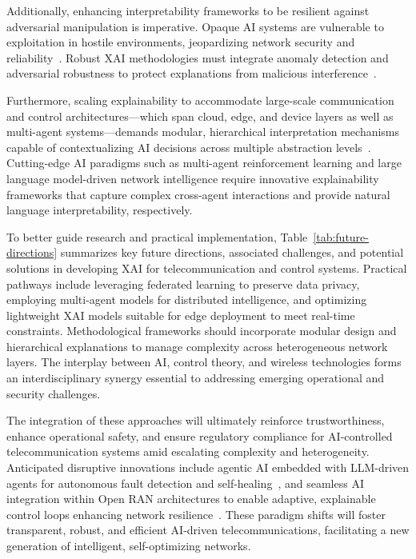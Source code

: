 \documentclass[sigconf]{acmart}
\begin{document}
Additionally, enhancing interpretability frameworks to be resilient against adversarial manipulation is imperative. Opaque AI systems are vulnerable to exploitation in hostile environments, jeopardizing network security and reliability~\cite{ref50}. Robust XAI methodologies must integrate anomaly detection and adversarial robustness to protect explanations from malicious interference~\cite{ref54}.

Furthermore, scaling explainability to accommodate large-scale communication and control architectures—which span cloud, edge, and device layers as well as multi-agent systems—demands modular, hierarchical interpretation mechanisms capable of contextualizing AI decisions across multiple abstraction levels~\cite{ref55}. Cutting-edge AI paradigms such as multi-agent reinforcement learning and large language model-driven network intelligence require innovative explainability frameworks that capture complex cross-agent interactions and provide natural language interpretability, respectively.

To better guide research and practical implementation, Table~\ref{tab:future-directions} summarizes key future directions, associated challenges, and potential solutions in developing XAI for telecommunication and control systems. Practical pathways include leveraging federated learning to preserve data privacy, employing multi-agent models for distributed intelligence, and optimizing lightweight XAI models suitable for edge deployment to meet real-time constraints. Methodological frameworks should incorporate modular design and hierarchical explanations to manage complexity across heterogeneous network layers. The interplay between AI, control theory, and wireless technologies forms an interdisciplinary synergy essential to addressing emerging operational and security challenges.

The integration of these approaches will ultimately reinforce trustworthiness, enhance operational safety, and ensure regulatory compliance for AI-controlled telecommunication systems amid escalating complexity and heterogeneity. Anticipated disruptive innovations include agentic AI embedded with LLM-driven agents for autonomous fault detection and self-healing~\cite{ref55}, and seamless AI integration within Open RAN architectures to enable adaptive, explainable control loops enhancing network resilience~\cite{ref54}. These paradigm shifts will foster transparent, robust, and efficient AI-driven telecommunications, facilitating a new generation of intelligent, self-optimizing networks.
\end{document}
